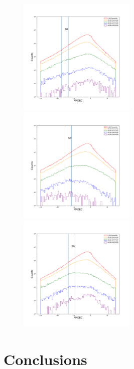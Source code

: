 \documentclass[12pt,prd]{article}
\begin{document}
\begin{figure}[h!]
\includegraphics[width=0.5\textwidth]{../figures/scanning_plotsgaiascan_l101_2_b58_4_ra212_7_dec55_2_npy_4.pdf}
\includegraphics[width=0.5\textwidth]{../figures/scanning_plotsgaiascan_l101_2_b58_4_ra212_7_dec55_2_npy_5.pdf}
\includegraphics[width=0.5\textwidth]{../figures/scanning_plotsgaiascan_l101_2_b58_4_ra212_7_dec55_2_npy_6.pdf}

\end{figure}


\section{Conclusions} \label{sec:conclusions}
\end{document}
